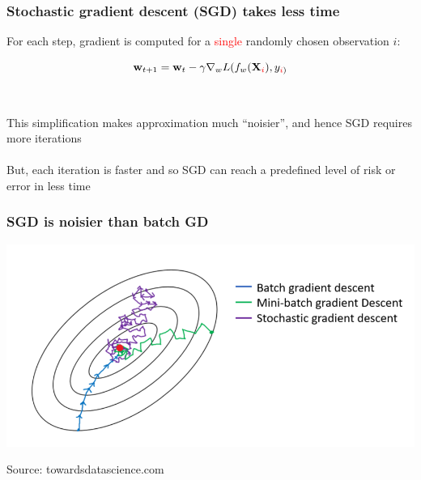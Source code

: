 \documentclass{beamer}
\begin{document}
\begin{frame}
	\frametitle{Stochastic gradient descent (SGD) takes less time}

	For each step, gradient is computed for a \textcolor{red}{single} randomly
	chosen observation $i$:

	$$
	{\mathbf{w}_{t+1}} = \mathbf{w}_t - \gamma \nabla_w
	L(f_w(\mathbf{X}_{\textcolor{red}{i}}), y_{\textcolor{red}{i})}
	$$ \\~\\

	This simplification makes approximation much ``noisier'', and hence SGD
	requires more iterations \\~\\

	But, each iteration is faster and so SGD can reach a predefined
	level of risk or error in less time
\end{frame}

\begin{frame}
\frametitle{SGD is noisier than batch GD}
	\centering
	\includegraphics[scale=0.3]{noise}

	\tiny Source: towardsdatascience.com
\end{frame}
\end{document}

